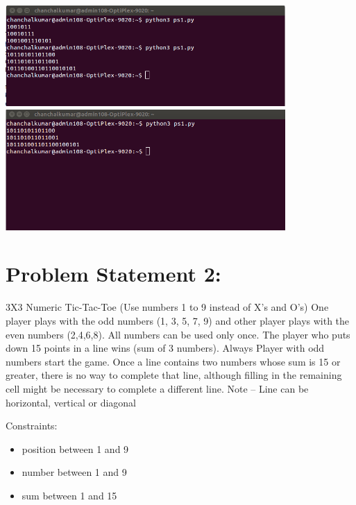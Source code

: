 \documentclass[12pt]{article}
\begin{document}
\includegraphics[width=0.8\textwidth]{screenpy1.png}\\


\includegraphics[width=0.8\textwidth]{screenpy2.png}\\





\newpage


\section{Problem Statement 2: }
3X3 Numeric Tic-Tac-Toe (Use numbers 1 to 9 instead of X’s and O’s)
One player plays with the odd numbers (1, 3, 5, 7, 9) and other player plays with the even numbers (2,4,6,8). All numbers can be used only once. The player who puts down 15 points in a line wins (sum of 3 numbers). Always Player with odd numbers start the game. Once a line contains two numbers whose sum is 15 or greater, there is no way to complete that line, although filling in the remaining cell might be necessary to complete a different line.
Note – Line can be horizontal, vertical or diagonal

Constraints:
\begin{itemize}
\item position between 1 and 9 

\item number between 1 and 9 

\item sum between 1 and 15
\end{itemize}
\end{document}
